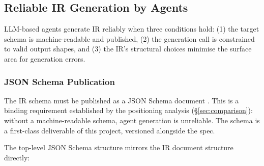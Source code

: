 \subsection{Reliable IR Generation by Agents}
\label{sec:agent-ir-generation}

LLM-based agents generate IR reliably when three conditions hold: (1) the target schema
is machine-readable and published, (2) the generation call is constrained to valid
output shapes, and (3) the IR's structural choices minimise the surface area for
generation errors.

\subsubsection{JSON Schema Publication}
\label{sec:json-schema}

The IR schema must be published as a JSON Schema document \cite{openai-structured-outputs}.
This is a binding requirement established by the positioning analysis
(\S\ref{sec:comparison}): without a machine-readable schema, agent generation is
unreliable. The schema is a first-class deliverable of this project, versioned alongside
the spec.

The top-level JSON Schema structure mirrors the IR document structure directly:


